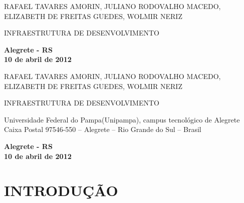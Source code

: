 \documentclass[12pt,a4paper]{article}
\begin{document}
\begin{titlepage}

\begin{center}
{\LARGE RAFAEL TAVARES AMORIN, JULIANO RODOVALHO MACEDO, ELIZABETH DE FREITAS GUEDES, WOLMIR NERIZ}
\par
\vspace{200pt}
{\Huge INFRAESTRUTURA DE DESENVOLVIMENTO}
\par
\vfill
\textbf{{\large Alegrete - RS}\\
{\large 10 de abril de 2012}}
\end{center}
\end{titlepage}

\thispagestyle{empty}
\cleardoublepage

\begin{center}
{\LARGE RAFAEL TAVARES AMORIN, JULIANO RODOVALHO MACEDO, ELIZABETH DE FREITAS GUEDES, WOLMIR NERIZ}
\par
\vspace{200pt}
{\Huge INFRAESTRUTURA DE DESENVOLVIMENTO}
\end{center}
\par
\vspace{90pt}
\hspace*{175pt}\parbox{7.6cm}{{\large Universidade Federal do Pampa(Unipampa), campus tecnológico de Alegrete
Caixa Postal 97546-550 – Alegrete – Rio Grande do Sul – Brasil
}}

\par
\vspace{1em}
\hspace*{175pt}\parbox{7.6cm}{{\large }}

\par
\vfill
\begin{center}
\textbf{{\large Alegrete - RS}\\
{\large 10 de abril de 2012}}
\end{center}

\thispagestyle{empty}
\clearpage
\thispagestyle{empty}
\tableofcontents
\thispagestyle{empty}
\clearpage

\section{INTRODUÇÃO}
\end{document}
